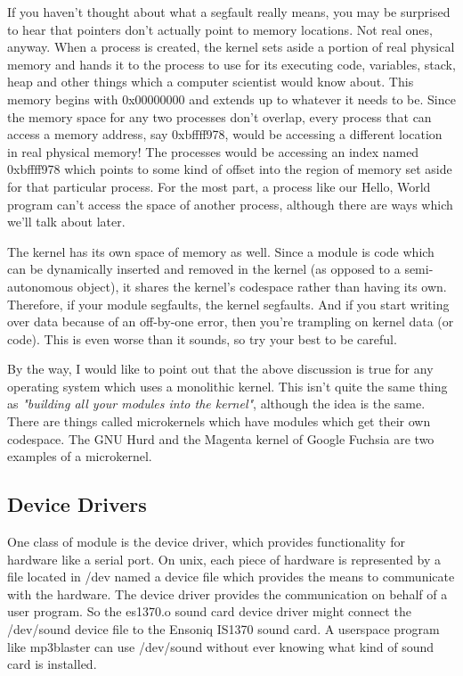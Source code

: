 \documentclass[11pt]{article}
\begin{document}
If you haven't thought about what a segfault really means, you may be surprised to hear that pointers don't actually point to memory locations. Not real ones, anyway. When a process is created, the kernel sets aside a portion of real physical memory and hands it to the process to use for its executing code, variables, stack, heap and other things which a computer scientist would know about. This memory begins with 0x00000000 and extends up to whatever it needs to be. Since the memory space for any two processes don't overlap, every process that can access a memory address, say 0xbffff978, would be accessing a different location in real physical memory! The processes would be accessing an index named 0xbffff978 which points to some kind of offset into the region of memory set aside for that particular process. For the most part, a process like our Hello, World program can't access the space of another process, although there are ways which we'll talk about later.

The kernel has its own space of memory as well. Since a module is code which can be dynamically inserted and removed in the kernel (as opposed to a semi-autonomous object), it shares the kernel's codespace rather than having its own. Therefore, if your module segfaults, the kernel segfaults. And if you start writing over data because of an off-by-one error, then you're trampling on kernel data (or code). This is even worse than it sounds, so try your best to be careful.

By the way, I would like to point out that the above discussion is true for any operating system which uses a monolithic kernel. This isn't quite the same thing as \emph{"building all your modules into the kernel"}, although the idea is the same. There are things called microkernels which have modules which get their own codespace. The GNU Hurd and the Magenta kernel of Google Fuchsia are two examples of a microkernel.

\subsection*{Device Drivers}
\label{sec:org75344d8}
One class of module is the device driver, which provides functionality for hardware like a serial port. On unix, each piece of hardware is represented by a file located in /dev named a device file which provides the means to communicate with the hardware. The device driver provides the communication on behalf of a user program. So the es1370.o sound card device driver might connect the /dev/sound device file to the Ensoniq IS1370 sound card. A userspace program like mp3blaster can use /dev/sound without ever knowing what kind of sound card is installed.
\end{document}
